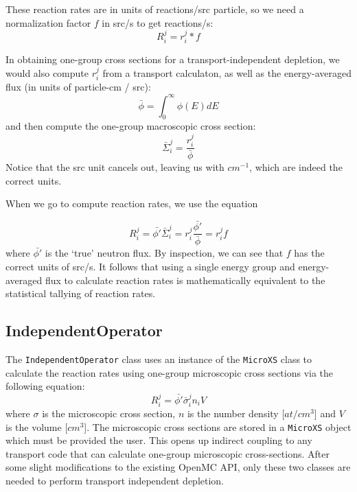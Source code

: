         These reaction rates are in units of reactions/src particle, so we need
        a normalization factor $f$ in src/s to get reactions/s:
        \begin{equation}
            R^j_i = r^j_i * f
        \end{equation}

        In obtaining one-group cross sections for a transport-independent
        depletion, we would also compute $r^j_i$ from a transport calculaton, as
        well as the energy-averaged flux (in units of particle-cm / src):
        \begin{equation}
            \bar{\phi} = \int_0^\infty \phi(E) dE
        \end{equation}
        and then compute the one-group macroscopic cross section:
        \begin{equation}
            \bar{\Sigma}^j_i = \frac{r^j_i}{\bar{\phi}}
        \end{equation}
        Notice that the src unit cancels out, leaving us with $cm^{-1}$, which
        are indeed the correct units.

        When we go to compute reaction rates, we use the equation 

        \begin{equation}
            R^j_i = \bar{\phi'} \bar\Sigma^j_i = r^j_i\frac{\bar{\phi'}}{\bar{\phi}} = r^j_i f
        \end{equation}
        where $\bar{\phi'}$ is the `true' neutron flux. By inspection, we can
        see that $f$ has the correct units of src/s. It follows that using a
        single energy group and energy-averaged flux to calculate reaction rates
        is mathematically equivalent to the statistical tallying of reaction
        rates.

            
    \subsection{IndependentOperator}
        The \verb.IndependentOperator. class uses an instance of the
        \verb.MicroXS. class to calculate the reaction rates using one-group
        microscopic cross sections via the following equation:
        \begin{equation}
            R^j_i = \bar{\phi'} \bar{\sigma}^j_i n_i V
        \end{equation}
        where $\sigma$ is the microscopic cross section, $n$ is the number
        density [$at/cm^3$] and $V$ is the volume [$cm^3$]. The microscopic
        cross sections are stored in a \verb.MicroXS. object which must be
        provided the user. This opens up indirect coupling to any transport code
        that can calculate one-group microscopic cross-sections. After some
        slight modifications to the existing OpenMC API, only these two classes
        are needed to perform transport independent depletion.


